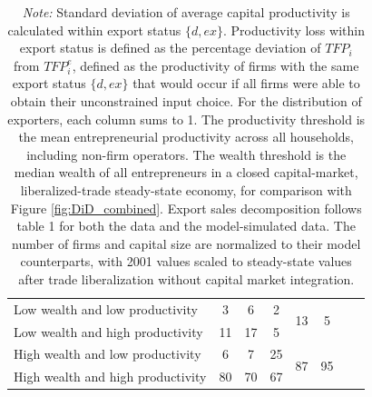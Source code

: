 \begin{table}[!ht]
{\begin{tabular}{l ccc | ccc c}
 Low wealth and low productivity & 3 & 6 & 2 & \multirow{2}{*}{13} & \multirow{2}{*}{5} \\
Low wealth and high productivity & 11 & 17 & 5 \\
High wealth and low productivity & 6 & 7 & 25 & \multirow{2}{*}{87} & \multirow{2}{*}{95} \\
High wealth and high productivity & 80 & 70 & 67 \\
\hline
\hline
\end{tabular}
}
\parbox{0.95\textwidth}{\caption*{\scriptsize \textit{Note:} Standard deviation of average capital productivity is calculated within export status \(\{d, ex\}\). Productivity loss within export status is defined as the percentage deviation of \(TFP_{i}\) from \(TFP_i^{e}\), defined as the productivity of firms with the same export status \(\{d, ex\}\) that would occur if all firms were able to obtain their unconstrained input choice. For the distribution of exporters, each column sums to 1. The productivity threshold is the mean entrepreneurial productivity across all households, including non-firm operators. The wealth threshold is the median wealth of all entrepreneurs in a closed capital-market, liberalized-trade steady-state economy, for comparison with Figure \ref{fig:DiD_combined}. Export sales decomposition follows \cite{annurev:/content/journals/10.1146/annurev-economics-090919-025159} table 1 for both the data and the model-simulated data. The number of firms and capital size are normalized to their model counterparts, with 2001 values scaled to steady-state values after trade liberalization without capital market integration.}}
\end{table}
